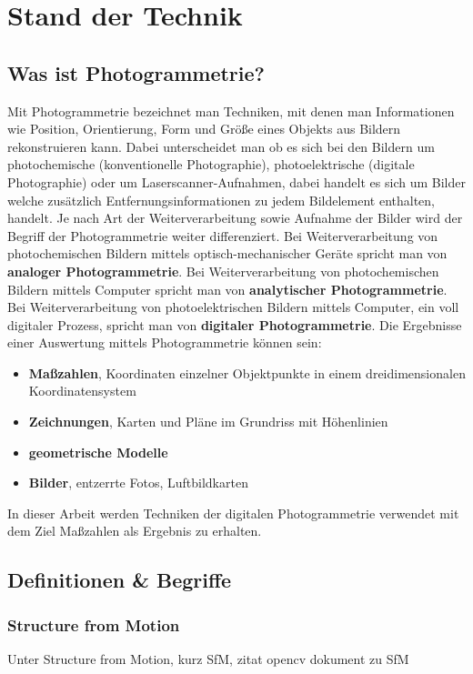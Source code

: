 
\chapter{Stand der Technik}

\section{Was ist Photogrammetrie?}
Mit Photogrammetrie bezeichnet man Techniken, mit denen man Informationen wie Position, Orientierung, Form und Größe eines Objekts aus Bildern rekonstruieren kann.
Dabei unterscheidet man ob es sich bei den Bildern um photochemische (konventionelle Photographie), photoelektrische (digitale Photographie) oder um Laserscanner-Aufnahmen, dabei handelt es sich um Bilder welche zusätzlich Entfernungsinformationen zu jedem Bildelement enthalten, handelt.
Je nach Art der Weiterverarbeitung sowie Aufnahme der Bilder wird der Begriff der Photogrammetrie weiter differenziert.
Bei Weiterverarbeitung von photochemischen Bildern mittels optisch-mechanischer Geräte spricht man von \textbf{analoger Photogrammetrie}.
Bei Weiterverarbeitung von photochemischen Bildern mittels Computer spricht man von \textbf{analytischer Photogrammetrie}.
Bei Weiterverarbeitung von photoelektrischen Bildern mittels Computer, ein voll digitaler Prozess, spricht man von \textbf{digitaler Photogrammetrie}.
Die Ergebnisse einer Auswertung mittels Photogrammetrie können sein: \cite{kraus_2004}
\begin{itemize}
\item \textbf{Maßzahlen}, Koordinaten einzelner Objektpunkte in einem dreidimensionalen Koordinatensystem
\item \textbf{Zeichnungen}, Karten und Pläne im Grundriss mit Höhenlinien
\item \textbf{geometrische Modelle}
\item \textbf{Bilder}, entzerrte Fotos, Luftbildkarten
\end{itemize}

In dieser Arbeit werden Techniken der digitalen Photogrammetrie verwendet mit dem Ziel Maßzahlen als Ergebnis zu erhalten.
 


\section{Definitionen \& Begriffe}
\subsection{Structure from Motion}\label{sec:sfm}
Unter Structure from Motion, kurz SfM, 
zitat opencv dokument zu SfM

